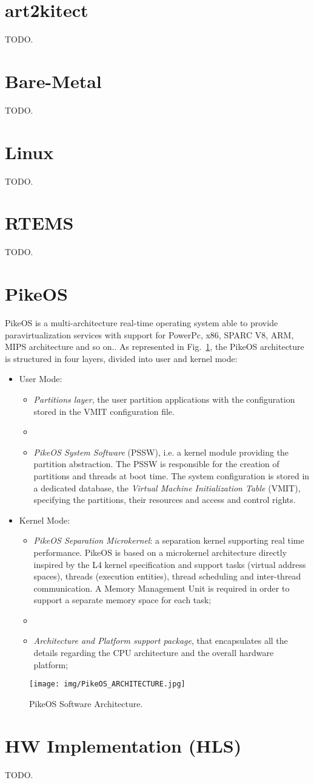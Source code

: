 \section{art2kitect}
%
TODO.
%
\section{Bare-Metal}
%
TODO.
%
\section{Linux}
%
TODO.
%
\section{RTEMS}
%
TODO.
%
\section{PikeOS}
%
PikeOS is a multi-architecture real-time operating system able to provide paravirtualization services with support for PowerPc, x86, SPARC V8, ARM, MIPS architecture and so on.. As represented in Fig.~\ref{fig2}, the PikeOS architecture is structured in four layers, divided into user and kernel mode:
%
\begin{itemize}
    \item User Mode:
    \begin{itemize}
        \item \textit{Partitions layer}, the user partition applications with the configuration stored in the VMIT configuration file.
        \item  \item \textit{PikeOS System Software} (PSSW), i.e. a kernel module providing the partition abstraction. The PSSW is responsible for the creation of partitions and threads at boot time. The system configuration is stored in a dedicated database, the \textit{Virtual Machine Initialization Table} (VMIT), specifying the partitions, their resources and access and control rights.
    \end{itemize}
    \item Kernel Mode:
    \begin{itemize}
        \item \textit{PikeOS Separation Microkernel}: a separation kernel supporting real time performance. PikeOS is based on a microkernel architecture directly inspired by the L4 kernel specification and support tasks (virtual address spaces), threads (execution entities), thread scheduling and inter-thread communication. A Memory Management Unit is required in order to support a separate memory space for each task;
        \item \item \textit{Architecture and Platform support package}, that encapsulates all the details regarding the CPU architecture and the overall hardware platform;
    \end{itemize}
\end{itemize}
%
\begin{figure}[htbp]
\centerline{\texttt{[image: img/PikeOS\_ARCHITECTURE.jpg]}}
\caption{PikeOS Software Architecture.}
\label{fig2}
\end{figure}
%
\section{HW Implementation (HLS)}
%
TODO.
%

